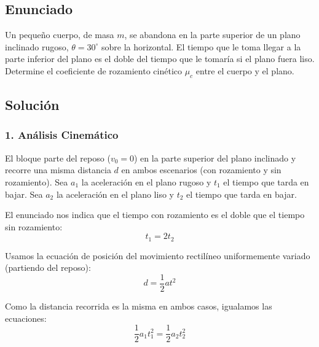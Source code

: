 \documentclass[12pt, a4paper]{article}
\begin{document}
\newpage

\subsection*{Enunciado}
Un pequeño cuerpo, de masa $m$, se abandona en la parte superior de un plano inclinado rugoso, $\theta = 30^\circ$ sobre la horizontal. El tiempo que le toma llegar a la parte inferior del plano es el doble del tiempo que le tomaría si el plano fuera liso. Determine el coeficiente de rozamiento cinético $\mu_c$ entre el cuerpo y el plano.

\begin{center}
\end{center}

\subsection*{Solución}

\subsubsection*{1. Análisis Cinemático}
El bloque parte del reposo ($v_0 = 0$) en la parte superior del plano inclinado y recorre una misma distancia $d$ en ambos escenarios (con rozamiento y sin rozamiento).
Sea $a_1$ la aceleración en el plano rugoso y $t_1$ el tiempo que tarda en bajar.
Sea $a_2$ la aceleración en el plano liso y $t_2$ el tiempo que tarda en bajar.

El enunciado nos indica que el tiempo con rozamiento es el doble que el tiempo sin rozamiento:
$$ t_1 = 2 t_2 $$

Usamos la ecuación de posición del movimiento rectilíneo uniformemente variado (partiendo del reposo):
$$ d = \frac{1}{2} a t^2 $$

Como la distancia recorrida es la misma en ambos casos, igualamos las ecuaciones:
$$ \frac{1}{2} a_1 t_1^2 = \frac{1}{2} a_2 t_2^2 $$
\end{document}
